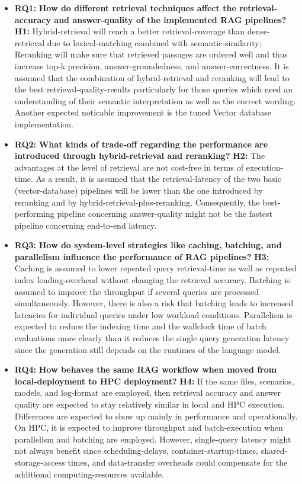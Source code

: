 \begin{itemize}

\item {\bfseries RQ1:} 
\textbf{How do different retrieval techniques affect the retrieval-accuracy and answer-quality of the implemented \ac{RAG} pipelines?}
{\bf H1: } 
Hybrid-retrieval will reach a better retrieval-coverage than dense-retrieval due to lexical-matching combined with semantic-similarity; Reranking will make sure that retrieved passages are ordered well and thus increase top-k precision, answer-groundedness, and answer-correctness. It is assumed that the combination of hybrid-retrieval and reranking will lead to the best retrieval-quality-results particularly for those queries which need an understanding of their semantic interpretation as well as the correct wording. Another expected noticable improvement is the tuned Vector database implementation.

\item {\bfseries RQ2: }
\textbf{What kinds of trade-off regarding the performance are introduced through hybrid-retrieval and reranking?}
{\bfseries H2: } 
The advantages at the level of retrieval are not cost-free in terms of execution-time. As a result, it is assumed that the retrieval-latency of the two basic (vector-database) pipelines will be lower than the one introduced by reranking and by hybrid-retrieval-plus-reranking. Consequently, the best-performing pipeline concerning answer-quality might not be the fastest pipeline concerning end-to-end latency.

\item {\bfseries RQ3: }
\textbf{How do system-level strategies like caching, batching, and parallelism influence the performance of \ac{RAG} pipelines?}
{\bfseries H3: } 
Caching is assumed to lower repeated query retrieval-time as well as repeated index loading-overhead without changing the retrieval accuracy. Batching is assumed to improve the throughput if several queries are processed simultaneously. However, there is also a risk that batching leads to increased latencies for individual queries under low workload conditions. Parallelism is expected to reduce the indexing time and the wallclock time of batch evaluations more clearly than it reduces the single query generation latency since the generation still depends on the runtimes of the language model.

\item {\bfseries RQ4: }
\textbf{How behaves the same \ac{RAG} workflow when moved from local-deployment to \ac{HPC} deployment?}
{\bfseries H4: } 
If the same files, scenarios, models, and log-format are employed, then retrieval accuracy and answer quality are expected to stay relatively similar in local and \ac{HPC} execution. Differences are expected to show up mainly in performance and operationally. On \ac{HPC}, it is expected to improve throughput and batch-execution when parallelism and batching are employed. However, single-query latency might not always benefit since scheduling-delays, container-startup-times, shared-storage-access times, and data-transfer overheads could compensate for the additional computing-resources available.

\end{itemize}

